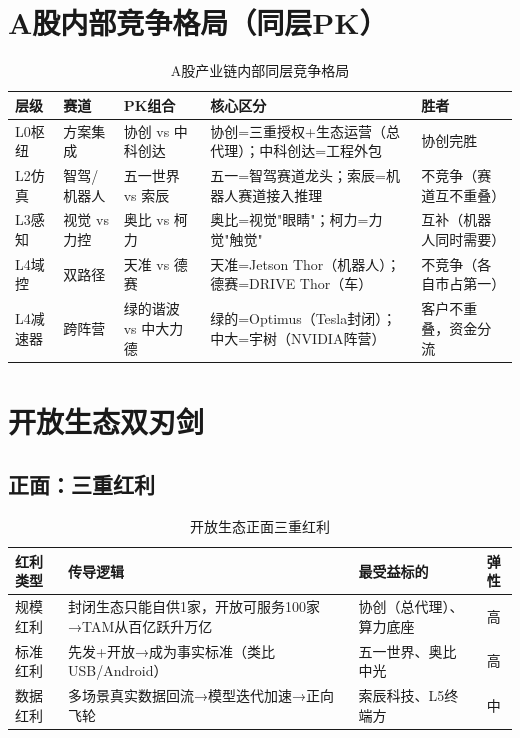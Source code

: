 \section{A股内部竞争格局（同层PK）}

\begin{table}[H]
\centering\scriptsize
\renewcommand{\arraystretch}{1.15}
\begin{tabularx}{\textwidth}{l l l X l}
\toprule
\textbf{层级} & \textbf{赛道} & \textbf{PK组合} & \textbf{核心区分} & \textbf{胜者} \\
\midrule
L0枢纽 & 方案集成 & 协创 vs 中科创达 & 协创=三重授权+生态运营（总代理）；中科创达=工程外包 & 协创完胜 \\
L2仿真 & 智驾/机器人 & 五一世界 vs 索辰 & 五一=智驾赛道龙头；索辰=机器人赛道接入推理 & 不竞争（赛道互不重叠） \\
L3感知 & 视觉 vs 力控 & 奥比 vs 柯力 & 奥比=视觉"眼睛"；柯力=力觉"触觉" & 互补（机器人同时需要） \\
L4域控 & 双路径 & 天准 vs 德赛 & 天准=Jetson Thor（机器人）；德赛=DRIVE Thor（车） & 不竞争（各自市占第一） \\
L4减速器 & 跨阵营 & 绿的谐波 vs 中大力德 & 绿的=Optimus（Tesla封闭）；中大=宇树（NVIDIA阵营） & 客户不重叠，资金分流 \\
\bottomrule
\end{tabularx}
\caption{A股产业链内部同层竞争格局}
\end{table}

\section{开放生态双刃剑}

\subsection{正面：三重红利}

\begin{table}[H]
\centering\scriptsize
\renewcommand{\arraystretch}{1.15}
\begin{tabularx}{\textwidth}{l X l c}
\toprule
\textbf{红利类型} & \textbf{传导逻辑} & \textbf{最受益标的} & \textbf{弹性} \\
\midrule
规模红利 & 封闭生态只能自供1家，开放可服务100家→TAM从百亿跃升万亿 & 协创（总代理）、算力底座 & 高 \\
标准红利 & 先发+开放→成为事实标准（类比USB/Android） & 五一世界、奥比中光 & 高 \\
数据红利 & 多场景真实数据回流→模型迭代加速→正向飞轮 & 索辰科技、L5终端方 & 中 \\
\bottomrule
\end{tabularx}
\caption{开放生态正面三重红利}
\end{table}

